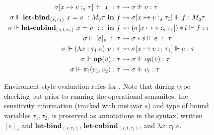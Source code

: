 \begin{figure}
\begin{center}
\begin{equation*}
  \begin{aligned}[c]
    \sigma[x \mapsto v :_s \tau] \Vdash \ x \ : \tau &\rightsquigarrow 
    \sigma \Vdash v : \tau \\
    \sigma \Vdash \textbf{let-bind}_{(s, \tau_1)} \ x = v \ : M_{q} \tau \ \textbf{in} \ f &\rightsquigarrow \sigma[x
    \mapsto v :_s \tau_1]
    \Vdash f : M_q \tau \\
    \sigma \Vdash \textbf{let-cobind}_{(s, t, \tau_1)} \ x = v \ : \tau \ \textbf{in} \ f &\rightsquigarrow (\sigma[x
    \mapsto v :_s \tau_1]) * t
    \Vdash f : \tau \\
    \sigma \Vdash [e]_s \ : \ \tau &\rightsquigarrow \sigma * s \Vdash e \ : \ \tau \\
    \sigma \Vdash (\lambda x : \tau_1 .e) \ v : \tau &\rightsquigarrow \sigma[x
    \mapsto v :_1 \tau_1] \Vdash e : \tau \\
    \sigma \Vdash \mathbf{op}(v) : \tau &\rightsquigarrow \sigma \Vdash op(v) :
    \tau \\
    \sigma \Vdash \pi_i\langle v_1,v_2 \rangle : \tau &\rightsquigarrow \sigma
    \Vdash v_i : \tau \\ 
  \end{aligned}
\end{equation*}

\end{center}
    \caption{Enviroment-style evaluation rules for \Lang. Note that during type
    checking but prior to running the operational semanitcs, the sensitivity
    information (tracked with metavar $s$) and type of bound variables $\tau_1,
    \tau_2$, is preserved as annotations in the syntax, written $[e]_s$ and
    $\textbf{let-bind}_{(s, \tau_1)}$, $\textbf{let-cobind}_{(s, t, \tau_1)}$,
    and $\lambda x : \tau_1 . e $.}
    \label{fig:sub_eval_rules}
\end{figure}
